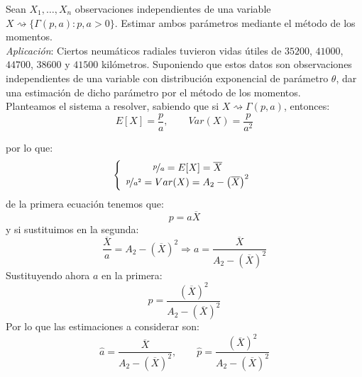 \begin{ejercicio}
    Sean $X_1, \ldots, X_n$ observaciones independientes de una variable $X\rightsquigarrow\{\Gamma(p,a) : p,a>0\}$. Estimar ambos parámetros mediante el método de los momentos.\\

    \noindent
    \textit{Aplicación}: Ciertos neumáticos radiales tuvieron vidas útiles de $35200$, $41000$, $44700$, $38600$ y $41500$ kilómetros. Suponiendo que estos datos son observaciones independientes de una variable con distribución exponencial de parámetro $\theta$, dar una estimación de dicho parámetro por el método de los momentos.\\

    \noindent
    Planteamos el sistema a resolver, sabiendo que si $X\rightsquigarrow \Gamma(p,a)$, entonces:
    \begin{equation*}
        E[X] = \frac{p}{a}, \qquad Var(X) = \frac{p}{a^2}
    \end{equation*}

    por lo que:
    \begin{equation*}
        \left\{\begin{array}{c}
                \nicefrac{p}{a} = E[X] = \overline{X} \\
                \nicefrac{p}{a^2} = Var(X) = A_2 - {\left(\overline{X}\right)}^2
        \end{array}\right.
    \end{equation*}
    de la primera ecuación tenemos que:
    \begin{equation*}
        p = a\overline{X}
    \end{equation*}
    y si sustituimos en la segunda:
    \begin{equation*}
        \frac{\overline{X}}{a} = A_2 - {\left(\overline{X}\right)}^2 \Longrightarrow a = \frac{\overline{X}}{A_2-{\left(\overline{X}\right)}^2}
    \end{equation*}
    Sustituyendo ahora $a$ en la primera:
    \begin{equation*}
        p = \frac{{\left(\overline{X}\right)}^{2}}{A_2-{\left(\overline{X}\right)}^{2}}
    \end{equation*}
    Por lo que las estimaciones a considerar son:
    \begin{equation*}
        \hat{a} = \frac{\overline{X}}{A_2-{\left(\overline{X}\right)}^2}, \qquad \hat{p} = \frac{{\left(\overline{X}\right)}^{2}}{A_2-{\left(\overline{X}\right)}^{2}}
    \end{equation*}~\\


\end{ejercicio}
